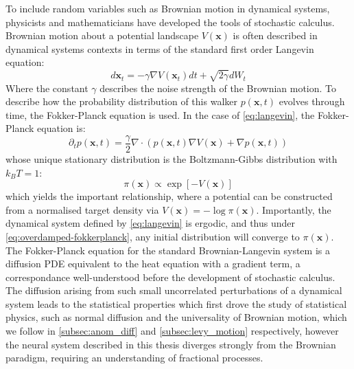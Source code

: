 To include random variables such as Brownian motion in dynamical systems, physicists and mathematicians have developed the tools of stochastic calculus. Brownian motion about a potential landscape $V(\textbf{x})$ is often described in dynamical systems contexts in terms of the standard first order Langevin equation:
\begin{equation}\label{eq:langevin}
    d\textbf{x}_t = -\gamma \nabla V(\textbf{x}_t) dt + \sqrt{2 \gamma} dW_t 
\end{equation}
Where the constant $\gamma$ describes the noise strength of the Brownian motion. To describe how the probability distribution of this walker $p(\textbf{x},t)$ evolves through time, the Fokker-Planck equation is used. In the case of \cref{eq:langevin}, the Fokker-Planck equation is:
\begin{equation}\label{eq:overdamped-fokkerplanck}
    \partial_t p(\textbf{x},t) = \frac{\gamma}{2} \nabla \cdot \left( p(\textbf{x},t) \nabla V(\textbf{x}) + \nabla p(\textbf{x},t) \right)
\end{equation}
whose unique stationary distribution is the Boltzmann-Gibbs distribution with $k_B T = 1$:
\begin{equation}\label{eq:boltzmann-gibbs}
    \pi(\textbf{x}) \propto \exp[-V(\textbf{x})]
\end{equation}
which yields the important relationship, where a potential can be constructed from a normalised target density via $V(\textbf{x}) = -\log \pi(\textbf{x})$. Importantly, the dynamical system defined by \cref{eq:langevin} is ergodic, and thus under \cref{eq:overdamped-fokkerplanck}, any initial distribution will converge to $\pi(\textbf{x})$. The Fokker-Planck equation for the standard Brownian-Langevin system is a diffusion PDE equivalent to the heat equation with a gradient term, a correspondance well-understood before the development of stochastic calculus. The diffusion arising from such small uncorrelated perturbations of a dynamical system leads to the statistical properties which first drove the study of statistical physics, such as normal diffusion and the universality of Brownian motion, which we follow in \cref{subsec:anom_diff} and \cref{subsec:levy_motion} respectively, however the neural system described in this thesis diverges strongly from the Brownian paradigm, requiring an understanding of fractional processes.

